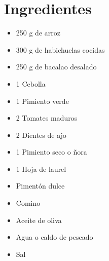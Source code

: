 
    \begin{minipage}[t]{0.35\textwidth}
        \section*{Ingredientes}
        \begin{itemize}[leftmargin=*]
            \item 250 g de arroz
            \item 300 g de habichuelas cocidas
            \item 250 g de bacalao desalado
            \item 1 Cebolla
            \item 1 Pimiento verde
            \item 2 Tomates maduros
            \item 2 Dientes de ajo
            \item 1 Pimiento seco o ñora
            \item 1 Hoja de laurel
            \item Pimentón dulce
            \item Comino
            \item Aceite de oliva
            \item Agua o caldo de pescado
            \item Sal
        \end{itemize}
    \end{minipage}
    \hfill
